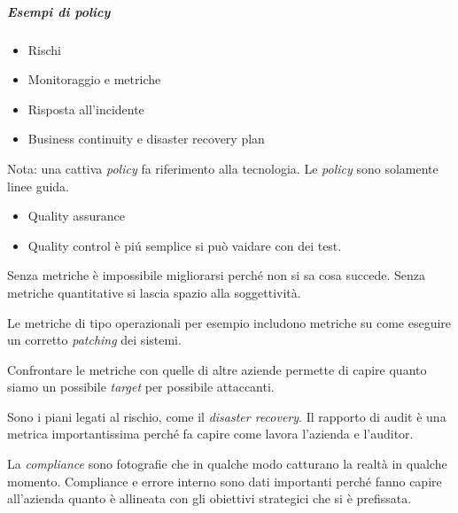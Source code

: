 

\subparagraph{Esempi di policy}

\begin{itemize}
\item Rischi
\item Monitoraggio e metriche
\item Risposta all'incidente
\item Business continuity e disaster recovery plan
\end{itemize}

Nota: una cattiva \textit{policy} fa riferimento alla tecnologia. Le 
\textit{policy} sono solamente linee guida.


\begin{itemize}
\item Quality assurance 
\item Quality control è piú semplice si può vaidare con dei test.
\end{itemize}






Senza metriche è impossibile migliorarsi perché non si sa cosa succede.
Senza metriche quantitative si lascia spazio alla soggettività.


Le metriche di tipo operazionali per esempio includono metriche su come eseguire 
un corretto \textit{patching} dei sistemi.


Confrontare le metriche con quelle di altre aziende permette di capire quanto 
siamo un possibile \textit{target} per possibile attaccanti.


Sono i piani legati al rischio, come il \textit{disaster recovery}.
Il rapporto di audit è una metrica importantissima perché fa capire come lavora 
l'azienda e l'auditor.



La \textit{compliance} sono fotografie che in qualche modo catturano la realtà 
in qualche momento. Compliance e errore interno sono dati importanti perché 
fanno capire all'azienda quanto è allineata con gli obiettivi strategici che si 
è prefissata.


